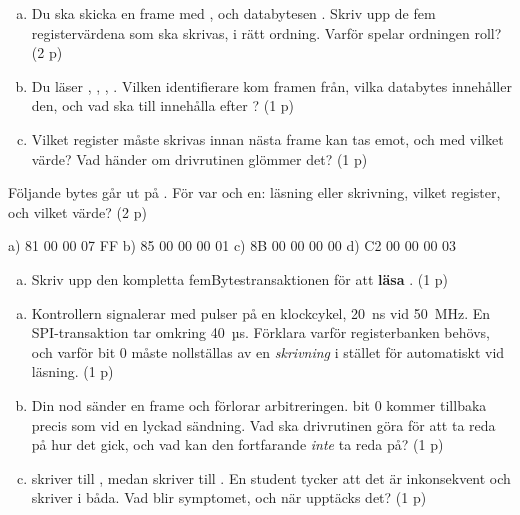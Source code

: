 \label{ex:d:7}
\begin{enumerate}[a)]
  \item Du ska skicka en frame med ,  och databytesen
    . Skriv upp de fem registervärdena som ska skrivas, i rätt ordning. Varför
    spelar ordningen roll? (2 p)
  \item Du läser , ,
    , . Vilken identifierare kom framen
    från, vilka databytes innehåller den, och vad ska  till
     innehålla efter ? (1 p)
  \item Vilket register måste skrivas innan nästa frame kan tas emot, och med vilket värde? Vad
    händer om drivrutinen glömmer det? (1 p)
\end{enumerate}

\label{ex:d:8}
Följande bytes går ut på . För var och en: läsning eller skrivning, vilket register, och
vilket värde? (2 p)
\begin{console}
a)  81 00 00 07 FF
b)  85 00 00 00 01
c)  8B 00 00 00 00
d)  C2 00 00 00 03
\end{console}
\begin{enumerate}[e)]
  \item Skriv upp den kompletta femBytestransaktionen för att \textbf{läsa} . (1 p)
\end{enumerate}

\label{ex:d:9}
\begin{enumerate}[a)]
  \item Kontrollern signalerar med pulser på en klockcykel, 20~ns vid 50~MHz. En SPI-transaktion
    tar omkring 40~µs. Förklara varför registerbanken behövs, och varför  bit 0 måste
    nollställas av en \emph{skrivning} i stället för automatiskt vid läsning. (1 p)
  \item Din nod sänder en frame och förlorar arbitreringen.  bit 0 kommer tillbaka
    precis som vid en lyckad sändning. Vad ska drivrutinen göra för att ta reda på hur det gick,
    och vad kan den fortfarande \emph{inte} ta reda på? (1 p)
  \item {} skriver  till , medan 
    skriver  till . En student tycker att det är inkonsekvent och skriver
     i båda. Vad blir symptomet, och när upptäcks det? (1 p)
\end{enumerate}
